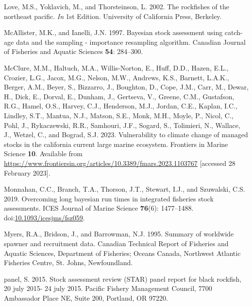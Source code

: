 \documentclass[11pt,
  english,
  letterpaper,
]{article}
\newlength{\cslhangindent}
\newenvironment{CSLReferences}[2] %
 {%
  \setlength{\parindent}{0pt}
  \ifodd #1 \everypar{\setlength{\hangindent}{\cslhangindent}}\ignorespaces\fi
  \ifnum #2 > 0
  \setlength{\parskip}{#2\baselineskip}
  \fi
 }%
 {}
\begin{document}
\begin{CSLReferences}{1}{0}
\leavevmode{}%
Love, M.S., Yoklavich, M., and Thorsteinson, L. 2002. The rockfishes of the northeast pacific. \emph{In} 1st Edition. University of California Press, Berkeley.

\leavevmode{}%
McAllister, M.K., and Ianelli, J.N. 1997. Bayesian stock assessment using catch-age data and the sampling - importance resampling algorithm. Canadian Journal of Fisheries and Aquatic Sciences \textbf{54}: 284--300.

\leavevmode{}%
McClure, M.M., Haltuch, M.A., Willis-Norton, E., Huff, D.D., Hazen, E.L., Crozier, L.G., Jacox, M.G., Nelson, M.W., Andrews, K.S., Barnett, L.A.K., Berger, A.M., Beyer, S., Bizzarro, J., Boughton, D., Cope, J.M., Carr, M., Dewar, H., Dick, E., Dorval, E., Dunham, J., Gertseva, V., Greene, C.M., Gustafson, R.G., Hamel, O.S., Harvey, C.J., Henderson, M.J., Jordan, C.E., Kaplan, I.C., Lindley, S.T., Mantua, N.J., Matson, S.E., Monk, M.H., Moyle, P., Nicol, C., Pohl, J., Rykaczewski, R.R., Samhouri, J.F., Sogard, S., Tolimieri, N., Wallace, J., Wetzel, C., and Bograd, S.J. 2023. Vulnerability to climate change of managed stocks in the california current large marine ecosystem. Frontiers in Marine Science \textbf{10}. Available from \url{https://www.frontiersin.org/articles/10.3389/fmars.2023.1103767} {[}accessed 28 February 2023{]}.

\leavevmode{}%
Monnahan, C.C., Branch, T.A., Thorson, J.T., Stewart, I.J., and Szuwalski, C.S. 2019. Overcoming long bayesian run times in integrated fisheries stock assessments. {ICES} Journal of Marine Science \textbf{76}(6): 1477--1488. doi:\href{https://doi.org/10.1093/icesjms/fsz059}{10.1093/icesjms/fsz059}.

\leavevmode{}%
Myers, R.A., Bridson, J., and Barrowman, N.J. 1995. Summary of worldwide spawner and recruitment data. Canadian Technical Report of Fisheries and Aquatic Sciences, Department of Fisheries; Oceans Canada, Northwest Atlantic Fisheries Centre, St. Johns, Newfoundland.

\leavevmode{}%
panel, S. 2015. Stock assessment review (STAR) panel report for black rockfish, 20 july 2015- 24 july 2015. Pacific Fishery Management Council, 7700 Ambassador Place NE, Suite 200, Portland, OR 97220.


\end{CSLReferences}
\end{document}
